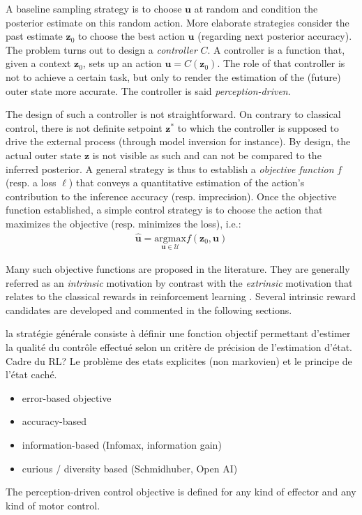 \documentclass{article}
\begin{document}
A baseline sampling strategy is to choose $\boldsymbol{u}$ at random and condition the posterior  estimate on this random action. 
More elaborate strategies consider the past estimate $\boldsymbol{z}_0$ to choose the best action $\boldsymbol{u}$ (regarding next posterior accuracy). The problem turns out to design  a \emph{controller} $C$. A controller is a function that, given a context $\boldsymbol{z}_0$, sets up an action $\boldsymbol{u} = C(\boldsymbol{z}_0)$. The role of that controller is not to achieve a certain task, but only to render the estimation of the (future) outer state more accurate. The controller is said \emph{perception-driven}. 

The design of such a controller is not straightforward. On contrary to classical control, there is not definite setpoint $\boldsymbol{z}^*$ to which the controller is supposed to drive the external process (through model inversion for instance). By design, the actual outer state $\boldsymbol{z}$ is not visible as such and can not be compared to the inferred posterior. A general strategy is thus to establish a \emph{objective function} $f$ (resp. a loss $\ell$) that conveys a quantitative estimation of the action's contribution to the inference accuracy (resp. imprecision). Once the objective function established, a simple control strategy is to choose the action that maximizes the objective (resp. minimizes the loss), i.e.:
\begin{align}
\hat{\boldsymbol{u}} = \underset{\boldsymbol{u}\in\mathcal{U}}{\text{argmax}}  f(\boldsymbol{z}_0, \boldsymbol{u})
\end{align}


Many such objective functions are proposed in the literature. They are generally referred as an \emph{intrinsic} motivation by contrast with the \emph{extrinsic} motivation that relates to the classical rewards in reinforcement learning \cite{sutton1998reinforcement}. Several intrinsic reward candidates are developed and commented in the following sections.

{\color{magenta} la stratégie générale consiste à définir une fonction objectif permettant d'estimer la qualité du contrôle effectué selon un critère de précision de l'estimation d'état. Cadre du RL? Le problème des etats explicites (non markovien) et le principe de l'état caché.}

{\color{blue} 
\begin{itemize}
	\item error-based objective
	\item accuracy-based
	\item information-based (Infomax, information gain)
	\item curious / diversity based  (Schmidhuber, Open AI)
\end{itemize}


The perception-driven control objective is defined for any kind of effector and any kind of motor control.} 
\end{document}
